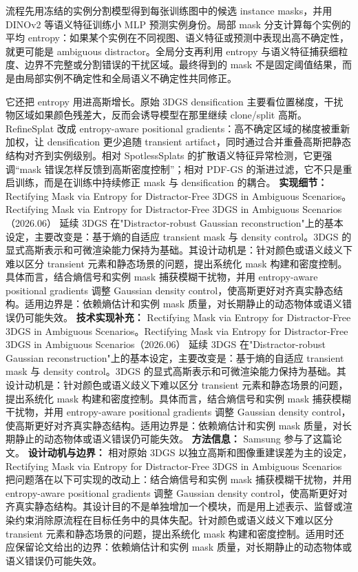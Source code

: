 流程先用冻结的实例分割模型得到每张训练图中的候选 instance masks，并用 DINOv2 等语义特征训练小 MLP 预测实例身份。局部 mask 分支计算每个实例的平均 entropy：如果某个实例在不同视图、语义特征或预测中表现出高不确定性，就更可能是 ambiguous distractor。全局分支再利用 entropy 与语义特征捕获细粒度、边界不完整或分割错误的干扰区域。最终得到的 mask 不是固定阈值结果，而是由局部实例不确定性和全局语义不确定性共同修正。

它还把 entropy 用进高斯增长。原始 3DGS densification 主要看位置梯度，干扰物区域如果颜色残差大，反而会诱导模型在那里继续 clone/split 高斯。RefineSplat 改成 entropy-aware positional gradients：高不确定区域的梯度被重新加权，让 densification 更少追随 transient artifact，同时通过合并重叠高斯把静态结构对齐到实例级别。相对 SpotlessSplats 的扩散语义特征异常检测，它更强调“mask 错误怎样反馈到高斯密度控制”；相对 PDF-GS 的渐进过滤，它不只是重启训练，而是在训练中持续修正 mask 与 densification 的耦合。
\textbf{实现细节：} Rectifying Mask via Entropy for Distractor-Free 3DGS in Ambiguous Scenarios。Rectifying Mask via Entropy for Distractor-Free 3DGS in Ambiguous Scenarios（2026.06） 延续 3DGS 在"Distractor-robust Gaussian reconstruction"上的基本设定，主要改变是：基于熵的自适应 transient mask 与 density control。3DGS 的显式高斯表示和可微渲染能力保持为基础。其设计动机是：针对颜色或语义歧义下难以区分 transient 元素和静态场景的问题，提出系统化 mask 构建和密度控制。具体而言，结合熵信号和实例 mask 捕获模糊干扰物，并用 entropy-aware positional gradients 调整 Gaussian density control，使高斯更好对齐真实静态结构。适用边界是：依赖熵估计和实例 mask 质量，对长期静止的动态物体或语义错误仍可能失效。
\textbf{技术实现补充：} Rectifying Mask via Entropy for Distractor-Free 3DGS in Ambiguous Scenarios。Rectifying Mask via Entropy for Distractor-Free 3DGS in Ambiguous Scenarios（2026.06） 延续 3DGS 在"Distractor-robust Gaussian reconstruction"上的基本设定，主要改变是：基于熵的自适应 transient mask 与 density control。3DGS 的显式高斯表示和可微渲染能力保持为基础。其设计动机是：针对颜色或语义歧义下难以区分 transient 元素和静态场景的问题，提出系统化 mask 构建和密度控制。具体而言，结合熵信号和实例 mask 捕获模糊干扰物，并用 entropy-aware positional gradients 调整 Gaussian density control，使高斯更好对齐真实静态结构。适用边界是：依赖熵估计和实例 mask 质量，对长期静止的动态物体或语义错误仍可能失效。
\textbf{方法信息：} Samsung 参与了这篇论文。
\textbf{设计动机与边界：} 相对原始 3DGS 以独立高斯和图像重建误差为主的设定，Rectifying Mask via Entropy for Distractor-Free 3DGS in Ambiguous Scenarios 把问题落在以下可实现的改动上：结合熵信号和实例 mask 捕获模糊干扰物，并用 entropy-aware positional gradients 调整 Gaussian density control，使高斯更好对齐真实静态结构。其设计目的不是单独增加一个模块，而是用上述表示、监督或渲染约束消除原流程在目标任务中的具体失配。针对颜色或语义歧义下难以区分 transient 元素和静态场景的问题，提出系统化 mask 构建和密度控制。适用时还应保留论文给出的边界：依赖熵估计和实例 mask 质量，对长期静止的动态物体或语义错误仍可能失效。

